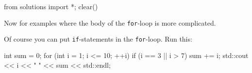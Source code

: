 \begin{python0}
from solutions import *; clear()
\end{python0}

Now for examples where the body of the \texttt{for}-loop is more complicated.

Of course you can put \texttt{if}-statements in the \texttt{for}-loop. Run this:
\begin{console}
int sum = 0;
for (int i = 1; i <= 10; ++i)
{   
    if (i == 3 || i > 7)
    {
        sum += i;
        std::cout << i << " " << sum << std::endl;
    }
}
\end{console}



